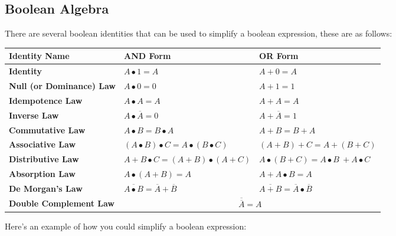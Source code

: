 \subsection{Boolean Algebra} \noindent
  There are several boolean identities that can be used to simplify a boolean expression, these are as follows: { \setlength\extrarowheight{5pt}
    \begin{longtable}{|l|l|l|}
      \hline
      \textbf{Identity Name} & \textbf{AND Form} & \textbf{OR Form} \\ \hline
      \textbf{Identity} & $A \bullet 1 = A$ & $A + 0 = A$  \\ \cline{2-3}
      \textbf{Null (or Dominance) Law} & $A \bullet 0 = 0$ & $A + 1 = 1$  \\ \cline{2-3}
      \textbf{Idempotence Law} & $A \bullet A = A$ & $A + A = A$  \\ \cline{2-3}
      \textbf{Inverse Law} & $A \bullet \overline{A} = 0$ & $A + \overline{A} = 1$  \\ \cline{2-3}
      \textbf{Commutative Law} & $A \bullet B = B \bullet A$ & $A + B = B + A$  \\ \cline{2-3}
      \textbf{Associative Law} & $(A \bullet B) \bullet C = A \bullet (B \bullet C)$ & $(A + B) + C = A + (B + C)$  \\ \cline{2-3}
      \textbf{Distributive Law} & $A + B \bullet C = (A+B)\bullet(A+C)$ & $A \bullet( B + C )= A \bullet B\ + A\bullet C$  \\ \cline{2-3}
      \textbf{Absorption Law} & $A \bullet (A+B) = A$ & $A + A\bullet B = A$  \\ \cline{2-3}
      \textbf{De Morgan's Law} & $\overline{A \bullet B} = \overline{A}+\overline{B}$ & $\overline{A + B} = \overline{A}\bullet\overline{B}$ \\ \cline{2-3}
      \textbf{Double Complement Law} & \multicolumn{2}{c|}{$\overline{\overline{A}}=A$}  \\ \hline
    \end{longtable} }
  \noindent
  Here's an example of how you could simplify a boolean expression:
